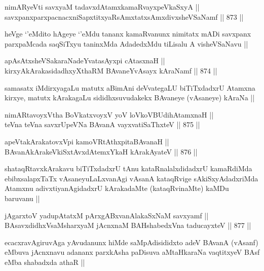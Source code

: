 
\begin{shl}
nimARyeVti savxyaM tadavxdAtamxkamaRvayxpeVkaSxyA || \\
savxpanxparxpacnacxniSapxtitxyaRsAmxtatxsAmxdivxsheVSaNamf ||  873 ||  
\end{shl}

\begin{artha}
heVge `\stext'eMdito hAgeye `\stext'eMdu tananx kamaRvanunx nimitatx mADi savxpanx parxpaMcada saqSiTxyu taninxMda AdadedxMdu tiLisalu A visheVSaNavu || 
\end{artha}


\begin{shl}
apAsAtxsheVSakaraNadeYvatasAyxpi cA\s \s tasxnaH || \\
kirxyAkArakasidadhxyXthaRM BAvaneYvAsayx kAraNamf ||  874 ||  
\end{shl}

\begin{artha}
samasatx iMdirxyagaLu matutx aBimAni deVvategaLU biTiTxdadxrU Atamxna kirxye, matutx kArakagaLu sididhxsuvudakekx BAvaneye (vAsaneye) kAraNa ||
\end{artha}


\begin{shl}
nimARtavoyxV\s tha BoVkatxvoyxV yoV loVkoV\s BUdihA\s \s tamxnaH ||  \\
teVna teVna savxrUpeVNa BAvanA vayxvatiSaThxteV ||  875 ||  
\end{shl}


\begin{shl}
apeVtakArakatovxV\s pi kamoVRtAthxpitaBAvanaH || \\
BAvanAkArakeVkiSxtAvxdAtemxYkaH kArakAyateV ||  876 || 
\end{shl}

\begin{artha}
shataqRtavxkArakavu biTiTxdadxrU tAnu kataRnalalxdidadxrU kamaRdiMda ebibxsalapxTaTx vAsaneyuLaLxvanAgi vAsanA kataqRvige sAkiSxyAdadxriMda Atamxnu adivxtiyanAgidadxrU kArakadaMte (kataqRvinaMte) kaMDu baruvanu ||
\end{artha}


\begin{shl}
jAgarxtoV yadupAtatxM pArxgABxvanAlakaSxNaM savxyamf || \\
BAsavxdidhxVsaMsharxyaM jAcnxnaM BAHshabedxVna taducayxteV ||  877 ||  
\end{shl}

\begin{artha}
ecacxravAgiruvAga yAvudanunx hiMde saMpAdisididxto adeV BAvanA (vAsanf) eMbuva jAcnxnavu adananx parxkAsha paDisuva aMtaHkaraNa vaqtitxyeV BAsf eMba shabadxda athaR ||
\end{artha}
